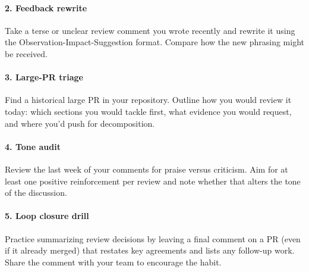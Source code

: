 \paragraph{2. Feedback rewrite} Take a terse or unclear review comment you wrote recently and rewrite it using the Observation-Impact-Suggestion format. Compare how the new phrasing might be received.

\paragraph{3. Large-PR triage} Find a historical large PR in your repository. Outline how you would review it today: which sections you would tackle first, what evidence you would request, and where you'd push for decomposition.

\paragraph{4. Tone audit} Review the last week of your comments for praise versus criticism. Aim for at least one positive reinforcement per review and note whether that alters the tone of the discussion.

\paragraph{5. Loop closure drill} Practice summarizing review decisions by leaving a final comment on a PR (even if it already merged) that restates key agreements and lists any follow-up work. Share the comment with your team to encourage the habit.
